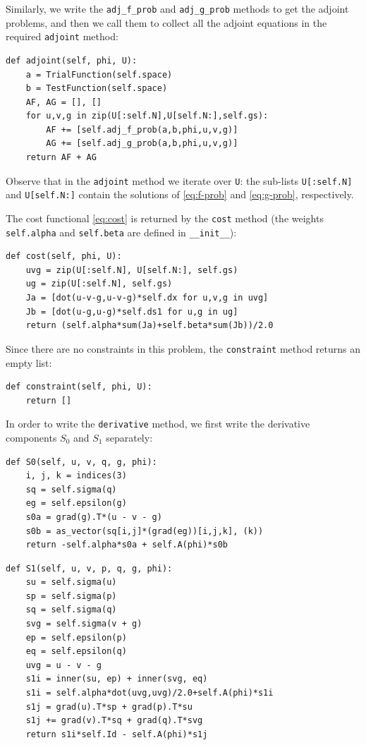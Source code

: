 \documentclass[preprint,9pt]{elsarticle}
\begin{document}
Similarly, we write the \texttt{adj\_f\_prob} and \texttt{adj\_g\_prob} methods
to get the adjoint problems, and then we call them to collect all the adjoint equations
in the required \texttt{adjoint} method:  
\begin{lstlisting}
def adjoint(self, phi, U):
	a = TrialFunction(self.space)
	b = TestFunction(self.space)
	AF, AG = [], []
	for u,v,g in zip(U[:self.N],U[self.N:],self.gs):
		AF += [self.adj_f_prob(a,b,phi,u,v,g)]  
		AG += [self.adj_g_prob(a,b,phi,u,v,g)]
	return AF + AG
\end{lstlisting}
Observe that in the \texttt{adjoint} method we iterate over \texttt{U}:
the sub-lists \texttt{U[:self.N]} and \texttt{U[self.N:]} 
contain the solutions of \eqref{eq:f-prob} and \eqref{eq:g-prob}, respectively.

The cost functional \eqref{eq:cost} is returned by the \texttt{cost} method
(the weights \texttt{self.alpha} and \texttt{self.beta} are defined in \texttt{\_\_init\_\_}):
\begin{lstlisting}
def cost(self, phi, U):
	uvg = zip(U[:self.N], U[self.N:], self.gs)
	ug = zip(U[:self.N], self.gs)
	Ja = [dot(u-v-g,u-v-g)*self.dx for u,v,g in uvg]
	Jb = [dot(u-g,u-g)*self.ds1 for u,g in ug]
	return (self.alpha*sum(Ja)+self.beta*sum(Jb))/2.0
\end{lstlisting}

Since there are no constraints in this problem,
the \texttt{constraint} method returns an empty list:
\begin{lstlisting}
def constraint(self, phi, U):
	return []
\end{lstlisting}

In order to write the \texttt{derivative} method,
we first write the derivative components $S_0$ and $S_1$ separately:
\begin{lstlisting}
def S0(self, u, v, q, g, phi):
	i, j, k = indices(3)
	sq = self.sigma(q)
	eg = self.epsilon(g)
	s0a = grad(g).T*(u - v - g)
	s0b = as_vector(sq[i,j]*(grad(eg))[i,j,k], (k))
	return -self.alpha*s0a + self.A(phi)*s0b	
\end{lstlisting}
\begin{lstlisting}
def S1(self, u, v, p, q, g, phi):
	su = self.sigma(u)
	sp = self.sigma(p)
	sq = self.sigma(q)
	svg = self.sigma(v + g)
	ep = self.epsilon(p)
	eq = self.epsilon(q)
	uvg = u - v - g
	s1i = inner(su, ep) + inner(svg, eq)
	s1i = self.alpha*dot(uvg,uvg)/2.0+self.A(phi)*s1i
	s1j = grad(u).T*sp + grad(p).T*su 
	s1j += grad(v).T*sq + grad(q).T*svg
	return s1i*self.Id - self.A(phi)*s1j
\end{lstlisting}
\end{document}

